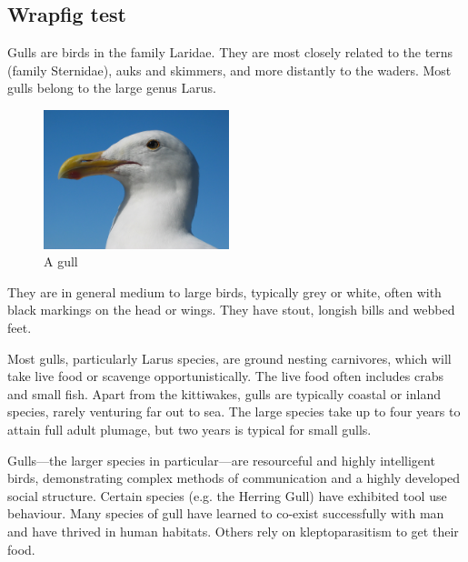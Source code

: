 \documentclass[a4paper,12pt]{article}
\begin{document}
\setRTL
\subsection*{Wrapfig test}

Gulls are birds in the family Laridae. They are most closely
 related to the terns (family Sternidae), auks and skimmers,
and more distantly to the waders. Most gulls belong to the
large genus Larus.

\begin{figure}
  \begin{center}
    \includegraphics[width=0.48\textwidth]{gull}
  \end{center}
  \caption{A gull}
\end{figure}

They are in general medium to large birds, typically grey or white,
often with black markings on the head or wings. They have stout,
longish bills and webbed feet.

Most gulls, particularly Larus species, are ground nesting carnivores,
which will take live food or scavenge opportunistically. The live food
often includes crabs and small fish. Apart from the kittiwakes, gulls
are typically coastal or inland species, rarely venturing far out to sea.
The large species take up to four years to attain full adult plumage,
but two years is typical for small gulls.

Gulls---the larger species in particular---are resourceful and
highly intelligent birds, demonstrating complex methods of communication
and a highly developed social structure. Certain species (e.g. the
Herring Gull) have exhibited tool use behaviour. Many species of gull have
learned to co-exist successfully with man and have thrived in human habitats.
Others rely on kleptoparasitism to get their food.
\end{document}

